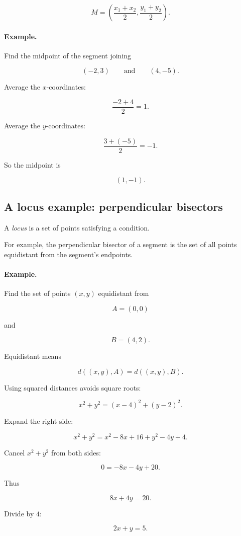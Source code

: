 \[
\boxed{
M=
\left(
\frac{x_1+x_2}{2},
\frac{y_1+y_2}{2}
\right).
}
\]

\paragraph{Example.}
Find the midpoint of the segment joining

\[
(-2,3)
\qquad\text{and}\qquad
(4,-5).
\]

Average the \(x\)-coordinates:

\[
\frac{-2+4}{2}=1.
\]

Average the \(y\)-coordinates:

\[
\frac{3+(-5)}{2}=-1.
\]

So the midpoint is

\[
\boxed{
(1,-1).
}
\]

\subsection{A locus example: perpendicular bisectors}
\label{appsubsec:locus-perpendicular-bisector}

A \emph{locus} is a set of points satisfying a condition.

For example, the perpendicular bisector of a segment is the set of all points
equidistant from the segment's endpoints.

\paragraph{Example.}
Find the set of points \((x,y)\) equidistant from

\[
A=(0,0)
\]

and

\[
B=(4,2).
\]

Equidistant means

\[
d((x,y),A)=d((x,y),B).
\]

Using squared distances avoids square roots:

\[
x^2+y^2=(x-4)^2+(y-2)^2.
\]

Expand the right side:

\[
x^2+y^2=x^2-8x+16+y^2-4y+4.
\]

Cancel \(x^2+y^2\) from both sides:

\[
0=-8x-4y+20.
\]

Thus

\[
8x+4y=20.
\]

Divide by \(4\):

\[
\boxed{
2x+y=5.
}
\]

